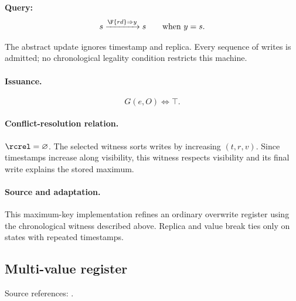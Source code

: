 \textbf{Query:}
\[
s\xrightarrow{\F{rd}\Rightarrow y}s\qquad\text{when }y=s.
\]

The abstract update ignores timestamp and replica. Every sequence of writes is admitted; no chronological legality condition restricts this machine.


\paragraph{Issuance.}
\[
G(e,O)\iff\top.
\]

\paragraph{Conflict-resolution relation.}
$\rcrel=\varnothing$. The selected witness sorts writes by increasing $(t,r,v)$. Since timestamps increase along visibility, this witness respects visibility and its final write explains the stored maximum.


\paragraph{Source and adaptation.}
This maximum-key implementation refines an ordinary overwrite register using the chronological witness described above. Replica and value break ties only on states with repeated timestamps.


\subsection{Multi-value register}
\label{app:dt-mvr}

\noindent Source references: \cite{shapiro2011comprehensive}.





